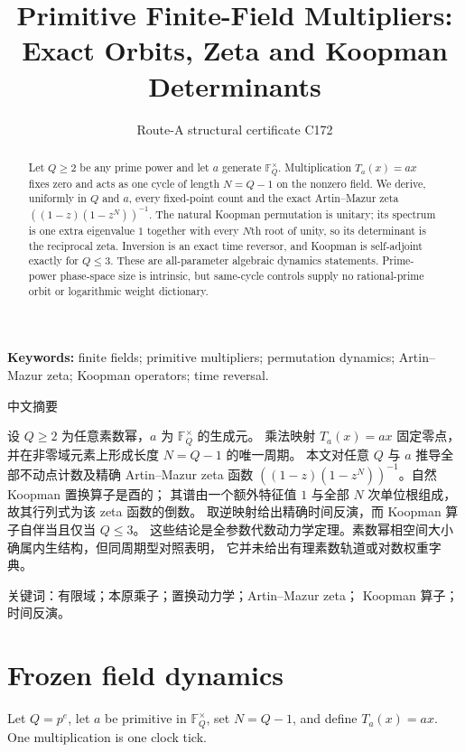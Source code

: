 \documentclass[10pt]{article}
\title{\vspace{-1.8em}Primitive Finite-Field Multipliers:\\Exact Orbits, Zeta and Koopman Determinants}
\author{Route-A structural certificate C172}
\date{}
\begin{document}
\maketitle
\begin{abstract}
Let $Q\geq2$ be any prime power and let $a$ generate
$\mathbb F_Q^\times$.  Multiplication $T_a(x)=ax$ fixes zero and acts as one
cycle of length $N=Q-1$ on the nonzero field.  We derive, uniformly in $Q$
and $a$, every fixed-point count and the exact Artin--Mazur zeta
$((1-z)(1-z^N))^{-1}$.  The natural Koopman permutation is unitary; its
spectrum is one extra eigenvalue $1$ together with every $N$th root of unity,
so its determinant is the reciprocal zeta.  Inversion is an exact time
reversor, and Koopman is self-adjoint exactly for $Q\leq3$.  These are
all-parameter algebraic dynamics statements.  Prime-power phase-space size is
intrinsic, but same-cycle controls supply no rational-prime orbit or
logarithmic weight dictionary.
\end{abstract}
\noindent\textbf{Keywords:} finite fields; primitive multipliers; permutation
dynamics; Artin--Mazur zeta; Koopman operators; time reversal.

\begin{otherlanguage}{chinese-simplified}
\begin{center}{\large 中文摘要}\end{center}
\begin{sloppypar}
设 $Q\geq2$ 为任意素数幂，$a$ 为 $\mathbb F_Q^\times$ 的生成元。
乘法映射 $T_a(x)=ax$ 固定零点，并在非零域元素上形成长度 $N=Q-1$ 的唯一周期。
本文对任意 $Q$ 与 $a$ 推导全部不动点计数及精确
\foreignlanguage{english}{Artin--Mazur zeta} 函数
$((1-z)(1-z^N))^{-1}$。自然 \foreignlanguage{english}{Koopman} 置换算子是酉的；
其谱由一个额外特征值 $1$ 与全部 $N$ 次单位根组成，故其行列式为该
\foreignlanguage{english}{zeta} 函数的倒数。
取逆映射给出精确时间反演，而 \foreignlanguage{english}{Koopman} 算子自伴当且仅当 $Q\leq3$。
这些结论是全参数代数动力学定理。素数幂相空间大小确属内生结构，但同周期型对照表明，
它并未给出有理素数轨道或对数权重字典。
\end{sloppypar}
\noindent 关键词：有限域；本原乘子；置换动力学；\foreignlanguage{english}{Artin--Mazur zeta}；
\foreignlanguage{english}{Koopman} 算子；时间反演。
\end{otherlanguage}

\section{Frozen field dynamics}
Let $Q=p^e$, let $a$ be primitive in $\mathbb F_Q^\times$, set $N=Q-1$,
and define $T_a(x)=ax$.  One multiplication is one clock tick.
\end{document}
